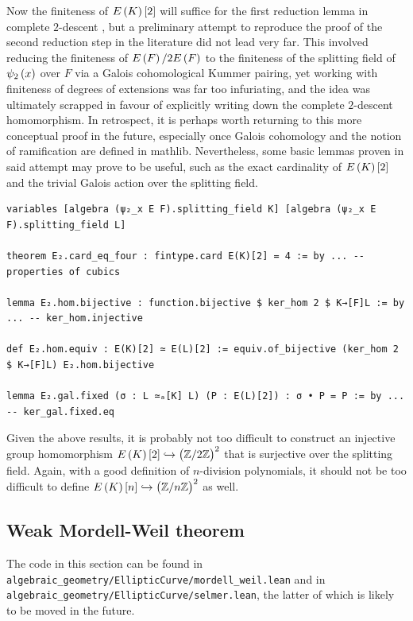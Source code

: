Now the finiteness of $ E\br{K}\sbr{2} $ will suffice for the first reduction lemma in complete $ 2 $-descent \cite[Lemma VIII.1.2]{Sil09}, but a preliminary attempt to reproduce the proof of the second reduction step in the literature \cite[Proposition VIII.1.2]{Sil09} did not lead very far. This involved reducing the finiteness of $ E\br{F} / 2E\br{F} $ to the finiteness of the splitting field of $ \psi_2\br{x} $ over $ F $ via a Galois cohomological Kummer pairing, yet working with finiteness of degrees of extensions was far too infuriating, and the idea was ultimately scrapped in favour of explicitly writing down the complete $ 2 $-descent homomorphism. In retrospect, it is perhaps worth returning to this more conceptual proof in the future, especially once Galois cohomology and the notion of ramification are defined in mathlib. Nevertheless, some basic lemmas proven in said attempt may prove to be useful, such as the exact cardinality of $ E\br{K}\sbr{2} $ and the trivial Galois action over the splitting field.

\begin{lstlisting}[frame=single]
variables [algebra (ψ₂_x E F).splitting_field K] [algebra (ψ₂_x E F).splitting_field L]

theorem E₂.card_eq_four : fintype.card E(K)[2] = 4 := by ... -- properties of cubics

lemma E₂.hom.bijective : function.bijective $ ker_hom 2 $ K→[F]L := by ... -- ker_hom.injective

def E₂.hom.equiv : E(K)[2] ≃ E(L)[2] := equiv.of_bijective (ker_hom 2 $ K→[F]L) E₂.hom.bijective

lemma E₂.gal.fixed (σ : L ≃ₐ[K] L) (P : E(L)[2]) : σ • P = P := by ... -- ker_gal.fixed.eq
\end{lstlisting}

Given the above results, it is probably not too difficult to construct an injective group homomorphism $ E\br{K}\sbr{2} \hookrightarrow \br{\ZZ / 2\ZZ}^2 $ that is surjective over the splitting field. Again, with a good definition of $ n $-division polynomials, it should not be too difficult to define $ E\br{K}\sbr{n} \hookrightarrow \br{\ZZ / n\ZZ}^2 $ as well.

\pagebreak

\subsection{Weak Mordell-Weil theorem}

The code in this section can be found in \texttt{algebraic\_geometry/EllipticCurve/mordell\_weil.lean} and in \texttt{algebraic\_geometry/EllipticCurve/selmer.lean}, the latter of which is likely to be moved in the future.

